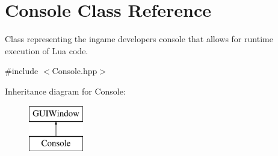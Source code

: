 \hypertarget{class_console}{}\section{Console Class Reference}
\label{class_console}


Class representing the ingame developers console that allows for runtime execution of Lua code.  




{\ttfamily \#include $<$Console.\+hpp$>$}

Inheritance diagram for Console\+:\begin{figure}[H]
\begin{center}
\leavevmode
\includegraphics[height=2.000000cm]{class_console}
\end{center}
\end{figure}
